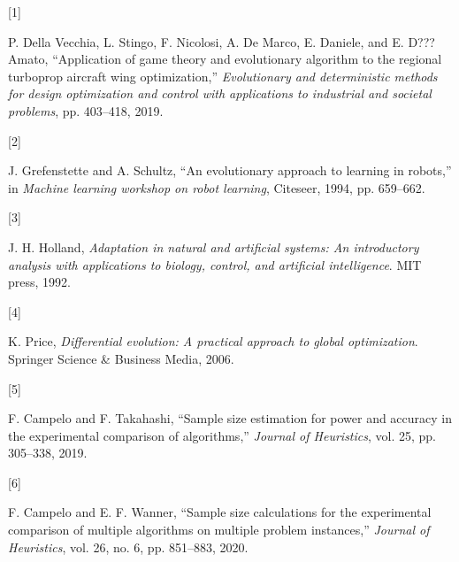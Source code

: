 \documentclass[
]{article}
\newlength{\cslhangindent}
\newlength{\csllabelwidth}
\newlength{\cslentryspacingunit} %
\newenvironment{CSLReferences}[2] %
 {%
  \setlength{\parindent}{0pt}
  \ifodd #1
  \let\oldpar\par
  \def\par{\hangindent=\cslhangindent\oldpar}
  \fi
  \setlength{\parskip}{#2\cslentryspacingunit}
 }%
 {}
\newcommand{\CSLLeftMargin}[1]{\parbox[t]{\csllabelwidth}{#1}}
\newcommand{\CSLRightInline}[1]{\parbox[t]{\linewidth - \csllabelwidth}{#1}\break}
\begin{document}
\hypertarget{refs}{}
\begin{CSLReferences}{0}{0}
\leavevmode{}%
\CSLLeftMargin{{[}1{]} }%
\CSLRightInline{P. Della Vecchia, L. Stingo, F. Nicolosi, A. De Marco,
E. Daniele, and E. D???Amato, {``Application of game theory and
evolutionary algorithm to the regional turboprop aircraft wing
optimization,''} \emph{Evolutionary and deterministic methods for design
optimization and control with applications to industrial and societal
problems}, pp. 403--418, 2019.}

\leavevmode{}%
\CSLLeftMargin{{[}2{]} }%
\CSLRightInline{J. Grefenstette and A. Schultz, {``An evolutionary
approach to learning in robots,''} in \emph{Machine learning workshop on
robot learning}, Citeseer, 1994, pp. 659--662.}

\leavevmode{}%
\CSLLeftMargin{{[}3{]} }%
\CSLRightInline{J. H. Holland, \emph{Adaptation in natural and
artificial systems: An introductory analysis with applications to
biology, control, and artificial intelligence}. MIT press, 1992.}

\leavevmode{}%
\CSLLeftMargin{{[}4{]} }%
\CSLRightInline{K. Price, \emph{Differential evolution: A practical
approach to global optimization}. Springer Science \& Business Media,
2006.}

\leavevmode{}%
\CSLLeftMargin{{[}5{]} }%
\CSLRightInline{F. Campelo and F. Takahashi, {``Sample size estimation
for power and accuracy in the experimental comparison of algorithms,''}
\emph{Journal of Heuristics}, vol. 25, pp. 305--338, 2019.}

\leavevmode{}%
\CSLLeftMargin{{[}6{]} }%
\CSLRightInline{F. Campelo and E. F. Wanner, {``Sample size calculations
for the experimental comparison of multiple algorithms on multiple
problem instances,''} \emph{Journal of Heuristics}, vol. 26, no. 6, pp.
851--883, 2020.}

\end{CSLReferences}
\end{document}
